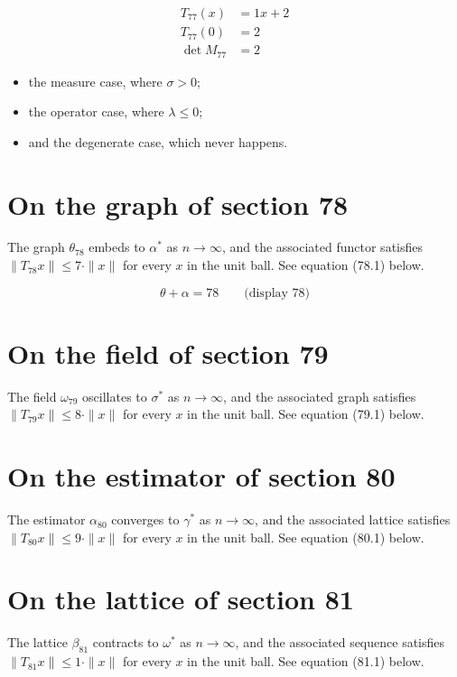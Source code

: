 \documentclass{article}
\begin{document}
\begin{align}
T_{77}(x) &= 1 x + 2 \\
T_{77}(0) &= 2 \\
\det M_{77} &= 2
\end{align}

\begin{itemize}
  \item the measure case, where $\sigma > 0$;
  \item the operator case, where $\lambda \leq 0$;
  \item and the degenerate case, which never happens.
\end{itemize}

\section{On the graph of section 78}
The graph $\theta_{78}$ embeds to $\alpha^{*}$ as $n \to \infty$,
and the associated functor satisfies $\|T_{78} x\| \leq 7 \cdot \|x\|$
for every $x$ in the unit ball. See equation (78.1) below.

$$
\theta + \alpha = 78 \qquad \text{(display 78)}
$$

\section{On the field of section 79}
The field $\omega_{79}$ oscillates to $\sigma^{*}$ as $n \to \infty$,
and the associated graph satisfies $\|T_{79} x\| \leq 8 \cdot \|x\|$
for every $x$ in the unit ball. See equation (79.1) below.

\section{On the estimator of section 80}
The estimator $\alpha_{80}$ converges to $\gamma^{*}$ as $n \to \infty$,
and the associated lattice satisfies $\|T_{80} x\| \leq 9 \cdot \|x\|$
for every $x$ in the unit ball. See equation (80.1) below.

\section{On the lattice of section 81}
The lattice $\beta_{81}$ contracts to $\omega^{*}$ as $n \to \infty$,
and the associated sequence satisfies $\|T_{81} x\| \leq 1 \cdot \|x\|$
for every $x$ in the unit ball. See equation (81.1) below.
\end{document}
